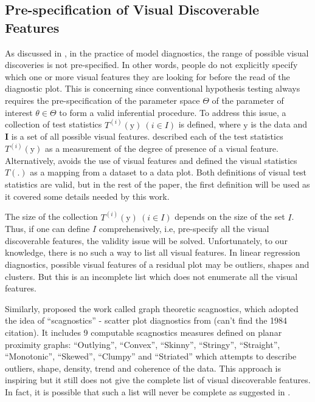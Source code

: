 \documentclass{monashthesis}
\begin{document}
\hypertarget{pre-specification-of-visual-discoverable-features-1}{%
\subsection{Pre-specification of Visual Discoverable Features}\label{pre-specification-of-visual-discoverable-features-1}}

As discussed in \textcite{buja_statistical_2009}, in the practice of model diagnostics, the range of possible visual discoveries is not pre-specified. In other words, people do not explicitly specify which one or more visual features they are looking for before the read of the diagnostic plot. This is concerning since conventional hypothesis testing always requires the pre-specification of the parameter space \(\Theta\) of the parameter of interest \(\theta \in \Theta\) to form a valid inferential procedure. To address this issue, a collection of test statistics \(T^{(i)}(\boldsymbol{\mathrm{y}})~(i \in I)\) is defined, where \(\boldsymbol{\mathrm{y}}\) is the data and \(\boldsymbol{I}\) is a set of all possible visual features. \textcite{buja_statistical_2009} described each of the test statistics \(T^{(i)}(\boldsymbol{\mathrm{y}})\) as a measurement of the degree of presence of a visual feature. Alternatively, \textcite{majumder_validation_2013} avoids the use of visual features and defined the visual statistics \(T(.)\) as a mapping from a dataset to a data plot. Both definitions of visual test statistics are valid, but in the rest of the paper, the first definition will be used as it covered some details needed by this work.

The size of the collection \(T^{(i)}(\boldsymbol{\mathrm{y}})~(i \in I)\) depends on the size of the set \(I\). Thus, if one can define \(I\) comprehensively, i.e, pre-specify all the visual discoverable features, the validity issue will be solved. Unfortunately, to our knowledge, there is no such a way to list all visual features. In linear regression diagnostics, possible visual features of a residual plot may be outliers, shapes and clusters. But this is an incomplete list which does not enumerate all the visual features.

Similarly, \textcite{wilkinson_graph-theoretic_2005} proposed the work called graph theoretic scagnostics, which adopted the idea of ``scagnostics'' - scatter plot diagnostics from (can't find the 1984 citation). It includes 9 computable scagnostics measures defined on planar proximity graphs: ``Outlying'', ``Convex'', ``Skinny'', ``Stringy'', ``Straight'', ``Monotonic'', ``Skewed'', ``Clumpy'' and ``Striated'' which attempts to describe outliers, shape, density, trend and coherence of the data. This approach is inspiring but it still does not give the complete list of visual discoverable features. In fact, it is possible that such a list will never be complete as suggested in \textcite{buja_statistical_2009}.
\end{document}

